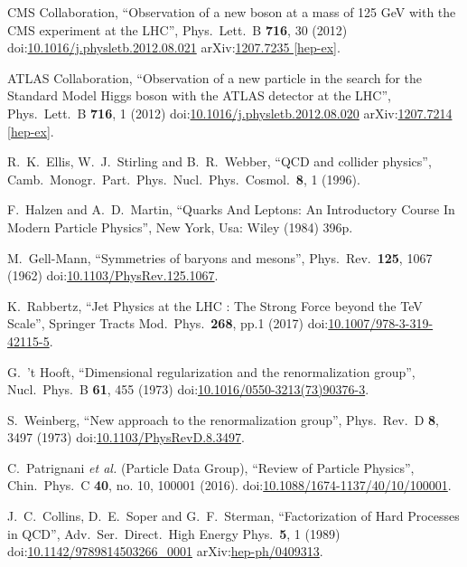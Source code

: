 \begin{thebibliography}{99}
CMS Collaboration, ``Observation of a new boson at a mass of 125 GeV with the CMS experiment at the LHC'', Phys.\ Lett.\ B {\bf 716}, 30 (2012) doi:\href{http://dx.doi.org/10.1016/j.physletb.2012.08.021}{10.1016/j.physletb.2012.08.021} arXiv:\href{https://arxiv.org/abs/1207.7235}{1207.7235 [hep-ex]}.

ATLAS Collaboration, ``Observation of a new particle in the search for the Standard Model Higgs boson with the ATLAS detector at the LHC'', Phys.\ Lett.\ B {\bf 716}, 1 (2012) doi:\href{http://dx.doi.org/10.1016/j.physletb.2012.08.020}{10.1016/j.physletb.2012.08.020} arXiv:\href{https://arxiv.org/abs/1207.7214}{1207.7214 [hep-ex]}.

R.~K.~Ellis, W.~J.~Stirling and B.~R.~Webber, ``QCD and collider physics'', Camb.\ Monogr.\ Part.\ Phys.\ Nucl.\ Phys.\ Cosmol.\ {\bf 8}, 1 (1996).

F.~Halzen and A.~D.~Martin, ``Quarks And Leptons: An Introductory Course In Modern Particle Physics'', New York, Usa: Wiley (1984) 396p.

M.~Gell-Mann, ``Symmetries of baryons and mesons'', Phys.\ Rev.\ {\bf 125}, 1067 (1962) doi:\href{http://dx.doi.org/10.1103/PhysRev.125.1067}{10.1103/PhysRev.125.1067}.

K.~Rabbertz, ``Jet Physics at the LHC : The Strong Force beyond the TeV Scale'', Springer Tracts Mod.\ Phys.\ {\bf 268}, pp.1 (2017) doi:\href{http://dx.doi.org/10.1007/978-3-319-42115-5}{10.1007/978-3-319-42115-5}.

G.~'t Hooft, ``Dimensional regularization and the renormalization group'', Nucl.\ Phys.\ B {\bf 61}, 455 (1973) doi:\href{http://dx.doi.org/10.1016/0550-3213(73)90376-3}{10.1016/0550-3213(73)90376-3}.

S.~Weinberg, ``New approach to the renormalization group'', Phys.\ Rev.\ D {\bf 8}, 3497 (1973) doi:\href{http://dx.doi.org/10.1103/PhysRevD.8.3497}{10.1103/PhysRevD.8.3497}.

C.~Patrignani {\it et al.} (Particle Data Group), ``Review of Particle Physics'', Chin.\ Phys.\ C {\bf 40}, no. 10, 100001 (2016). doi:\href{http://dx.doi.org/10.1088/1674-1137/40/10/100001}{10.1088/1674-1137/40/10/100001}.

J.~C.~Collins, D.~E.~Soper and G.~F.~Sterman, ``Factorization of Hard Processes in QCD'', Adv.\ Ser.\ Direct.\ High Energy Phys.\ {\bf 5}, 1 (1989) doi:\href{http://dx.doi.org/10.1142/9789814503266\_0001}{10.1142/9789814503266\_0001} arXiv:\href{https://arxiv.org/abs/hep-ph/0409313}{hep-ph/0409313}.


\end{thebibliography}
